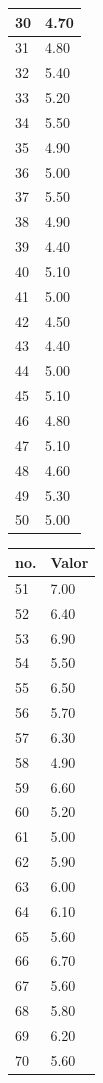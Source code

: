 \begin{table}[!ht]
\begin{tabular}{ |l|l| }
30	&	4.70	\\ \hline
31	&	4.80	\\ \hline
32	&	5.40	\\ \hline
33	&	5.20	\\ \hline
34	&	5.50	\\ \hline
35	&	4.90	\\ \hline
36	&	5.00	\\ \hline
37	&	5.50	\\ \hline
38	&	4.90	\\ \hline
39	&	4.40	\\ \hline
40	&	5.10	\\ \hline
41	&	5.00	\\ \hline
42	&	4.50	\\ \hline
43	&	4.40	\\ \hline
44	&	5.00	\\ \hline
45	&	5.10	\\ \hline
46	&	4.80	\\ \hline
47	&	5.10	\\ \hline
48	&	4.60	\\ \hline
49	&	5.30	\\ \hline
50	&	5.00	\\ \hline
\end{tabular}
\begin{tabular}{ |l|l| }
\hline
 no. & Valor \\ \hline
51	&	7.00	\\ \hline
52	&	6.40	\\ \hline
53	&	6.90	\\ \hline
54	&	5.50	\\ \hline
55	&	6.50	\\ \hline
56	&	5.70	\\ \hline
57	&	6.30	\\ \hline
58	&	4.90	\\ \hline
59	&	6.60	\\ \hline
60	&	5.20	\\ \hline
61	&	5.00	\\ \hline
62	&	5.90	\\ \hline
63	&	6.00	\\ \hline
64	&	6.10	\\ \hline
65	&	5.60	\\ \hline
66	&	6.70	\\ \hline
67	&	5.60	\\ \hline
68	&	5.80	\\ \hline
69	&	6.20	\\ \hline
70	&	5.60	\\ \hline

\end{tabular}
\end{table}
